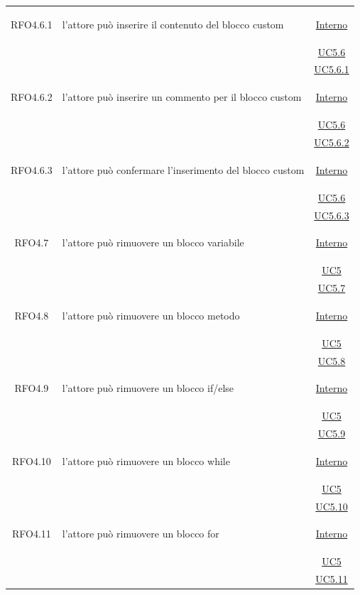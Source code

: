 \begin{longtable}{|c|>{\centering}m{7cm}|c|}
\hypertarget{RFO4.6.1}{RFO4.6.1} & l'attore può inserire il contenuto del blocco custom & \hyperlink{Interno}{Interno}\\
& &\hyperref[UC5.6]{UC5.6}\\
& &\hyperref[UC5.6.1]{UC5.6.1}\\ \hline

\hypertarget{RFO4.6.2}{RFO4.6.2} & l'attore può inserire un commento per il blocco custom & \hyperlink{Interno}{Interno}\\
& &\hyperref[UC5.6]{UC5.6}\\
& &\hyperref[UC5.6.2]{UC5.6.2}\\ \hline

\hypertarget{RFO4.6.3}{RFO4.6.3} & l'attore può confermare l'inserimento del blocco custom &\hyperlink{Interno}{Interno}\\
& &\hyperref[UC5.6]{UC5.6}\\
& &\hyperref[UC5.6.3]{UC5.6.3}\\ \hline

\hypertarget{RFO4.7}{RFO4.7} & l'attore può rimuovere un blocco variabile &\hyperlink{Interno}{Interno}\\
& &\hyperref[UC5]{UC5}\\
& &\hyperref[UC5.7]{UC5.7}\\ \hline

\hypertarget{RFO4.8}{RFO4.8} & l'attore può rimuovere un blocco metodo & \hyperlink{Interno}{Interno}\\
& &\hyperref[UC5]{UC5}\\
& &\hyperref[UC5.8]{UC5.8}\\ \hline

\hypertarget{RFO4.9}{RFO4.9} & l'attore può rimuovere un blocco if/else & \hyperlink{Interno}{Interno}\\
& &\hyperref[UC5]{UC5}\\
& &\hyperref[UC5.9]{UC5.9}\\ \hline

\hypertarget{RFO4.10}{RFO4.10} & l'attore può rimuovere un blocco while & \hyperlink{Interno}{Interno}\\
& &\hyperref[UC5]{UC5}\\
& & \hyperref[UC5.10]{UC5.10}\\ \hline

\hypertarget{RFO4.11}{RFO4.11} & l'attore può rimuovere un blocco for & \hyperlink{Interno}{Interno}\\
& &\hyperref[UC5]{UC5}\\
& &\hyperref[UC5.11]{UC5.11}\\ \hline


\end{longtable}

